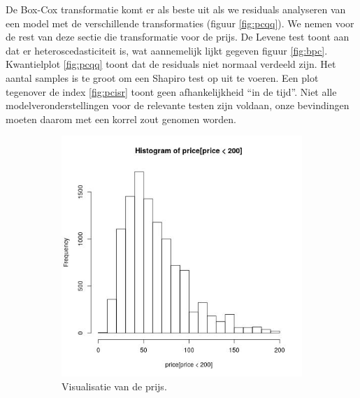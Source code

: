 \documentclass[a4paper,kulak]{kulakarticle} %
\begin{document}
De Box-Cox transformatie komt er als beste uit als we residuals analyseren van een model met de verschillende transformaties (figuur \ref{fig:pcqq}).
We nemen voor de rest van deze sectie die transformatie voor de prijs.
De Levene test toont aan dat er heteroscedasticiteit is, wat aannemelijk lijkt gegeven figuur \ref{fig:bpc}.
Kwantielplot \ref{fig:pcqq} toont dat de residuals niet normaal verdeeld zijn.
Het aantal samples is te groot om een Shapiro test op uit te voeren.
Een plot tegenover de index \ref{fig:pcisr} toont geen afhankelijkheid ``in de tijd''.
Niet alle modelveronderstellingen voor de relevante testen zijn voldaan, onze bevindingen moeten daarom met een korrel zout genomen worden.\\
\begin{figure}[H]
	\centering
	\begin{subfigure}[b]{0.23\textwidth}
		\includegraphics[width=\textwidth]{prijsVis.jpg}
		\caption{Visualisatie van de prijs.}
		\label{fig:pv}
	\end{subfigure}
	~ %
	\begin{subfigure}[b]{0.23\textwidth}

\end{subfigure}
\end{figure}
\end{document}
